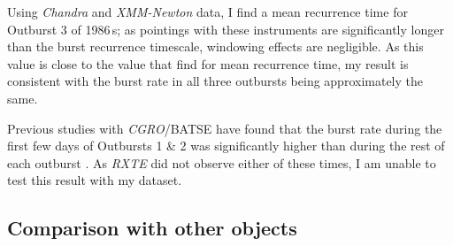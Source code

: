 \par Using \indexchandra\textit{Chandra} and \indexxmm\textit{XMM-Newton} data, I find a mean recurrence time for Outburst 3 of 1986\,s; as pointings with these instruments are significantly longer than the burst recurrence timescale, windowing effects are negligible.  As this value is close to the value that \citet{Aptekar_Recur} find for mean recurrence time, my result is consistent with the burst rate in all three outbursts being approximately the same.
\par Previous studies with \textit{CGRO}/BATSE have found that the burst rate during the first few days of Outbursts 1 \& 2 was significantly higher than during the rest of each outburst \citep{Kouveliotou_BP,Woods_OB2}.  As \indexrxte\textit{RXTE} did not observe either of these times, I am unable to test this result with my dataset.

\subsection{Comparison with other objects}

